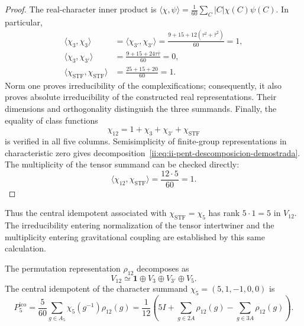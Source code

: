 \begin{proof}
The real-character inner product is
\(\langle\chi,\psi\rangle
=\frac1{60}\sum_C|C|\chi(C)\psi(C)\).
In particular,
\begin{align*}
 \langle\chi_3,\chi_3\rangle
 &=\langle\chi_{3'},\chi_{3'}\rangle
 =\frac{9+15+12(\tau^2+\bar\tau^2)}{60}=1,\\
 \langle\chi_3,\chi_{3'}\rangle
 &=\frac{9+15+24\tau\bar\tau}{60}=0,\\
 \langle\chi_{\mathrm{STF}},\chi_{\mathrm{STF}}\rangle
 &=\frac{25+15+20}{60}=1.
\end{align*}
Norm one proves irreducibility of the complexifications;
consequently, it also proves absolute irreducibility of the constructed
real representations. Their dimensions and orthogonality distinguish the
three summands. Finally, the equality of class functions
\[
 \chi_{12}=1+\chi_3+\chi_{3'}+\chi_{\mathrm{STF}}
\]
is verified in all five columns. Semisimplicity of finite-group
representations in characteristic zero gives
decomposition~\eqref{ii:eq:ii-pent-descomposicion-demostrada}. The
multiplicity of the tensor summand can be checked directly:
\[
 \langle\chi_{12},\chi_{\mathrm{STF}}\rangle
 =\frac{12\cdot5}{60}=1.
\]
\end{proof}

Thus the central idempotent associated with
\(\chi_{\mathrm{STF}}=\chi_5\) has rank
\(5\cdot1=5\) in \(V_{12}\). The irreducibility entering
normalization of the tensor intertwiner and the multiplicity
entering gravitational coupling are established by
this same calculation.



The permutation representation \(\rho_{12}\) decomposes as
\begin{equation}
\label{ii:ii:pent:eq:gravity-v12-decomposition}
V_{12}\simeq\mathbf1\oplus V_3\oplus V_{3'}\oplus V_5.
\end{equation}
The central idempotent of the character summand
\(\chi_5=(5,1,-1,0,0)\) is
\begin{equation}
\label{ii:ii:pent:eq:gravity-p5}
\boxed{
P^{\mathrm{ico}}_5=\frac5{60}\sum_{g\in A_5}\chi_5(g^{-1})\rho_{12}(g)
=\frac1{12}\left(
5I+\sum_{g\in2A}\rho_{12}(g)
-\sum_{g\in3A}\rho_{12}(g)
\right).}
\end{equation}

